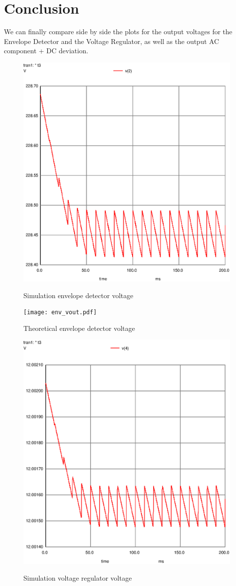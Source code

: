 \newpage
\section{Conclusion}
\label{sec:conclusion}

We can finally compare side by side the plots for the output voltages for the Envelope Detector and the Voltage Regulator, as well as the output AC component + DC deviation. 


\begin{figure}[!ht] \centering
\caption{Simulation envelope detector voltage}
\includegraphics[width=0.6\linewidth]{venv.eps}
\label{fig:sim1}
\end{figure}

\begin{figure}[!ht] \centering
\caption{Theoretical envelope detector voltage}
\squeezeup 
\squeezeup 
\squeezeup 
\squeezeup 
\squeezeup 
\squeezeup 
\squeezeup 
\squeezeup 
\texttt{[image: env\_vout.pdf]}
\label{fig:theo1}
\end{figure}

\begin{figure}[!ht] \centering
\caption{Simulation voltage regulator voltage}
\includegraphics[width=0.6\linewidth]{vout.eps}
\label{fig:sim2}
\end{figure}


